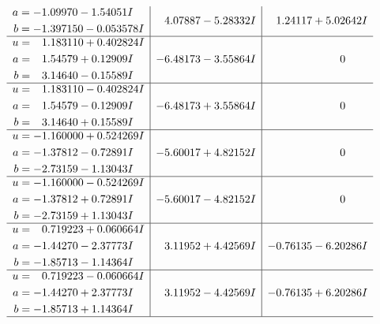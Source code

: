 \documentclass[1p]{elsarticle_modified}
\theoremstyle{definition}
\begin{document}
$$\begin{array}{c|c|c}
\begin{aligned}
a &= -1.09970 - 1.54051 I \\
b &= -1.397150 - 0.053578 I\end{aligned}
 & \phantom{-}4.07887 - 5.28332 I & \phantom{-}1.24117 + 5.02642 I \\ \hline\begin{aligned}
u &= \phantom{-}1.183110 + 0.402824 I \\
a &= \phantom{-}1.54579 + 0.12909 I \\
b &= \phantom{-}3.14640 - 0.15589 I\end{aligned}
 & -6.48173 - 3.55864 I & \phantom{-0.000000 } 0 \\ \hline\begin{aligned}
u &= \phantom{-}1.183110 - 0.402824 I \\
a &= \phantom{-}1.54579 - 0.12909 I \\
b &= \phantom{-}3.14640 + 0.15589 I\end{aligned}
 & -6.48173 + 3.55864 I & \phantom{-0.000000 } 0 \\ \hline\begin{aligned}
u &= -1.160000 + 0.524269 I \\
a &= -1.37812 - 0.72891 I \\
b &= -2.73159 - 1.13043 I\end{aligned}
 & -5.60017 + 4.82152 I & \phantom{-0.000000 } 0 \\ \hline\begin{aligned}
u &= -1.160000 - 0.524269 I \\
a &= -1.37812 + 0.72891 I \\
b &= -2.73159 + 1.13043 I\end{aligned}
 & -5.60017 - 4.82152 I & \phantom{-0.000000 } 0 \\ \hline\begin{aligned}
u &= \phantom{-}0.719223 + 0.060664 I \\
a &= -1.44270 - 2.37773 I \\
b &= -1.85713 - 1.14364 I\end{aligned}
 & \phantom{-}3.11952 + 4.42569 I & -0.76135 - 6.20286 I \\ \hline\begin{aligned}
u &= \phantom{-}0.719223 - 0.060664 I \\
a &= -1.44270 + 2.37773 I \\
b &= -1.85713 + 1.14364 I\end{aligned}
 & \phantom{-}3.11952 - 4.42569 I & -0.76135 + 6.20286 I\\
 \hline 

\end{array}$$
\end{document}
